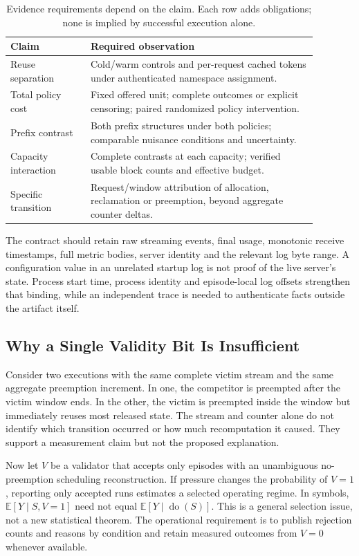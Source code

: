 \documentclass[a4paper,twoside]{article}
\begin{document}
\begin{table}[t]
\caption{Evidence requirements depend on the claim. Each row adds obligations; none is implied by successful execution alone.}
\label{tab:contract}
\centering\small
\begin{tabular}{p{0.23\linewidth}p{0.65\linewidth}}
\toprule
Claim & Required observation \\
\midrule
Reuse separation & Cold/warm controls and per-request cached tokens under authenticated namespace assignment. \\
Total policy cost & Fixed offered unit; complete outcomes or explicit censoring; paired randomized policy intervention. \\
Prefix contrast & Both prefix structures under both policies; comparable nuisance conditions and uncertainty. \\
Capacity interaction & Complete contrasts at each capacity; verified usable block counts and effective budget. \\
Specific transition & Request/window attribution of allocation, reclamation or preemption, beyond aggregate counter deltas. \\
\bottomrule
\end{tabular}
\end{table}

The contract should retain raw streaming events, final usage, monotonic receive timestamps, full metric bodies, server identity and the relevant log byte range. A configuration value in an unrelated startup log is not proof of the live server's state. Process start time, process identity and episode-local log offsets strengthen that binding, while an independent trace is needed to authenticate facts outside the artifact itself.

\subsection{Why a Single Validity Bit Is Insufficient}

Consider two executions with the same complete victim stream and the same aggregate preemption increment. In one, the competitor is preempted after the victim window ends. In the other, the victim is preempted inside the window but immediately reuses most released state. The stream and counter alone do not identify which transition occurred or how much recomputation it caused. They support a measurement claim but not the proposed explanation.

Now let $V$ be a validator that accepts only episodes with an unambiguous no-preemption scheduling reconstruction. If pressure changes the probability of $V=1$, reporting only accepted runs estimates a selected operating regime. In symbols, $\mathbb{E}[Y\mid S,V=1]$ need not equal $\mathbb{E}[Y\mid\operatorname{do}(S)]$. This is a general selection issue, not a new statistical theorem. The operational requirement is to publish rejection counts and reasons by condition and retain measured outcomes from $V=0$ whenever available.
\end{document}
